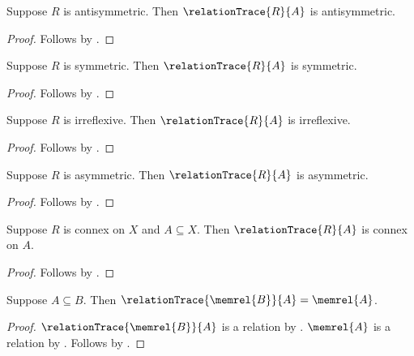 \begin{proposition}\label{relation_trace_antisymmetric}
    Suppose $R$ is antisymmetric.
    Then $\relationTrace{R}{A}$ is antisymmetric.
\end{proposition}
\begin{proof}
    Follows by .
\end{proof}

\begin{proposition}\label{relation_trace_symmetric}
    Suppose $R$ is symmetric.
    Then $\relationTrace{R}{A}$ is symmetric.
\end{proposition}
\begin{proof}
    Follows by .
\end{proof}

\begin{proposition}\label{relation_trace_irreflexive}
    Suppose $R$ is irreflexive.
    Then $\relationTrace{R}{A}$ is irreflexive.
\end{proposition}
\begin{proof}
    Follows by .
\end{proof}

\begin{proposition}\label{relation_trace_asymmetric}
    Suppose $R$ is asymmetric.
    Then $\relationTrace{R}{A}$ is asymmetric.
\end{proposition}
\begin{proof}
    Follows by .
\end{proof}

\begin{proposition}\label{relation_trace_connex_on}
    Suppose $R$ is connex on $X$ and $A\subseteq X$.
    Then $\relationTrace{R}{A}$ is connex on $A$.
\end{proposition}
\begin{proof}
    Follows by .
\end{proof}

\begin{proposition}\label{membership_relation_trace}
    Suppose $A\subseteq B$.
    Then $\relationTrace{\memrel{B}}{A}=\memrel{A}$.
\end{proposition}
\begin{proof}
    $\relationTrace{\memrel{B}}{A}$ is a relation by
        .
    $\memrel{A}$ is a relation by .
    Follows by
        .
\end{proof}
